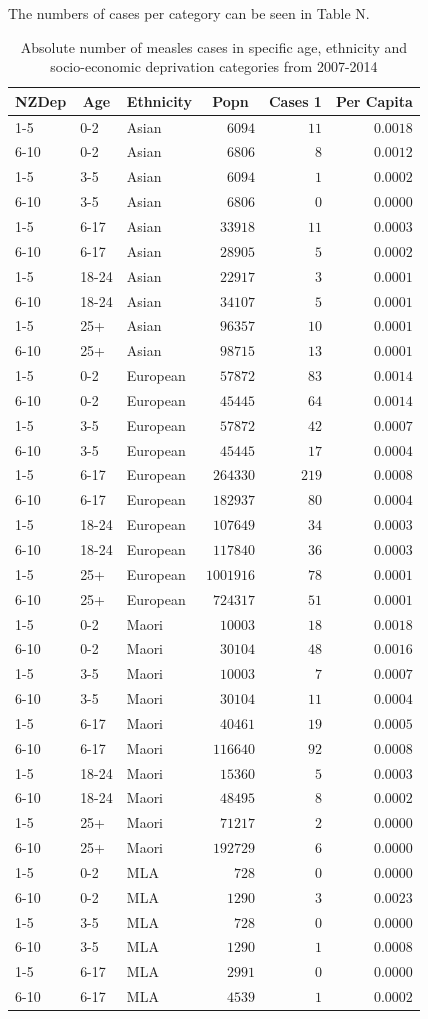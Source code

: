 \documentclass{article}
\begin{document}
The numbers of cases per category can be seen in Table N.
\begin{table}\tiny
\caption{Absolute number of measles cases in specific age, ethnicity and socio-economic deprivation categories from 2007-2014}
\begin{center}
\begin{tabular}{lllrrr}
\hline\hline
\multicolumn{1}{c}{NZDep}&\multicolumn{1}{c}{Age}&\multicolumn{1}{c}{Ethnicity}&\multicolumn{1}{c}{Popn}&\multicolumn{1}{c}{Cases 1}&\multicolumn{1}{c}{Per Capita}\tabularnewline
\hline
1-5&0-2&Asian&$   6094$&$ 11$&$0.0018$\tabularnewline
6-10&0-2&Asian&$   6806$&$  8$&$0.0012$\tabularnewline
1-5&3-5&Asian&$   6094$&$  1$&$0.0002$\tabularnewline
6-10&3-5&Asian&$   6806$&$  0$&$0.0000$\tabularnewline
1-5&6-17&Asian&$  33918$&$ 11$&$0.0003$\tabularnewline
6-10&6-17&Asian&$  28905$&$  5$&$0.0002$\tabularnewline
1-5&18-24&Asian&$  22917$&$  3$&$0.0001$\tabularnewline
6-10&18-24&Asian&$  34107$&$  5$&$0.0001$\tabularnewline
1-5&25+&Asian&$  96357$&$ 10$&$0.0001$\tabularnewline
6-10&25+&Asian&$  98715$&$ 13$&$0.0001$\tabularnewline
1-5&0-2&European&$  57872$&$ 83$&$0.0014$\tabularnewline
6-10&0-2&European&$  45445$&$ 64$&$0.0014$\tabularnewline
1-5&3-5&European&$  57872$&$ 42$&$0.0007$\tabularnewline
6-10&3-5&European&$  45445$&$ 17$&$0.0004$\tabularnewline
1-5&6-17&European&$ 264330$&$219$&$0.0008$\tabularnewline
6-10&6-17&European&$ 182937$&$ 80$&$0.0004$\tabularnewline
1-5&18-24&European&$ 107649$&$ 34$&$0.0003$\tabularnewline
6-10&18-24&European&$ 117840$&$ 36$&$0.0003$\tabularnewline
1-5&25+&European&$1001916$&$ 78$&$0.0001$\tabularnewline
6-10&25+&European&$ 724317$&$ 51$&$0.0001$\tabularnewline
1-5&0-2&Maori&$  10003$&$ 18$&$0.0018$\tabularnewline
6-10&0-2&Maori&$  30104$&$ 48$&$0.0016$\tabularnewline
1-5&3-5&Maori&$  10003$&$  7$&$0.0007$\tabularnewline
6-10&3-5&Maori&$  30104$&$ 11$&$0.0004$\tabularnewline
1-5&6-17&Maori&$  40461$&$ 19$&$0.0005$\tabularnewline
6-10&6-17&Maori&$ 116640$&$ 92$&$0.0008$\tabularnewline
1-5&18-24&Maori&$  15360$&$  5$&$0.0003$\tabularnewline
6-10&18-24&Maori&$  48495$&$  8$&$0.0002$\tabularnewline
1-5&25+&Maori&$  71217$&$  2$&$0.0000$\tabularnewline
6-10&25+&Maori&$ 192729$&$  6$&$0.0000$\tabularnewline
1-5&0-2&MLA&$    728$&$  0$&$0.0000$\tabularnewline
6-10&0-2&MLA&$   1290$&$  3$&$0.0023$\tabularnewline
1-5&3-5&MLA&$    728$&$  0$&$0.0000$\tabularnewline
6-10&3-5&MLA&$   1290$&$  1$&$0.0008$\tabularnewline
1-5&6-17&MLA&$   2991$&$  0$&$0.0000$\tabularnewline
6-10&6-17&MLA&$   4539$&$  1$&$0.0002$\tabularnewline

\end{tabular}
\end{center}
\end{table}
\end{document}
